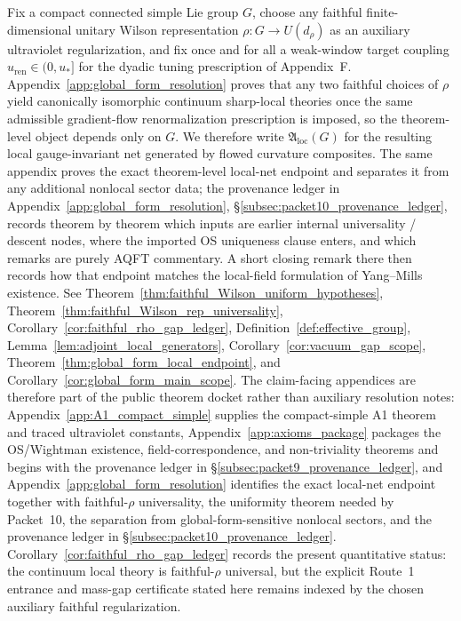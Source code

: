 \begin{theorem}\label{thm:main}
Fix a compact connected simple Lie group $G$, choose any faithful finite-dimensional unitary Wilson representation $\rho:G\to U(d_\rho)$ as an auxiliary ultraviolet regularization, and fix once and for all a weak-window target coupling $u_{\mathrm{ren}}\in(0,u_\ast]$ for the dyadic tuning prescription of Appendix~F.
Appendix~\ref{app:global_form_resolution} proves that any two faithful choices of $\rho$ yield canonically isomorphic continuum sharp-local theories once the same admissible gradient-flow renormalization prescription is imposed, so the theorem-level object depends only on $G$.
We therefore write $\mathfrak A_{\mathrm{loc}}(G)$ for the resulting local gauge-invariant net generated by flowed curvature composites.
The same appendix proves the exact theorem-level local-net endpoint and separates it from any additional nonlocal sector data; the provenance ledger in Appendix~\ref{app:global_form_resolution}, \S\ref{subsec:packet10_provenance_ledger}, records theorem by theorem which inputs are earlier internal universality / descent nodes, where the imported OS uniqueness clause enters, and which remarks are purely AQFT commentary. A short closing remark there then records how that endpoint matches the local-field formulation of Yang--Mills existence.
See Theorem~\ref{thm:faithful_Wilson_uniform_hypotheses}, Theorem~\ref{thm:faithful_Wilson_rep_universality}, Corollary~\ref{cor:faithful_rho_gap_ledger}, Definition~\ref{def:effective_group}, Lemma~\ref{lem:adjoint_local_generators}, Corollary~\ref{cor:vacuum_gap_scope}, Theorem~\ref{thm:global_form_local_endpoint}, and Corollary~\ref{cor:global_form_main_scope}.
The claim-facing appendices are therefore part of the public theorem docket rather than auxiliary resolution notes: Appendix~\ref{app:A1_compact_simple} supplies the compact-simple A1 theorem and traced ultraviolet constants, Appendix~\ref{app:axioms_package} packages the OS/Wightman existence, field-correspondence, and non-triviality theorems and begins with the provenance ledger in \S\ref{subsec:packet9_provenance_ledger}, and Appendix~\ref{app:global_form_resolution} identifies the exact local-net endpoint together with faithful-$\rho$ universality, the uniformity theorem needed by Packet~10, the separation from global-form-sensitive nonlocal sectors, and the provenance ledger in \S\ref{subsec:packet10_provenance_ledger}.
Corollary~\ref{cor:faithful_rho_gap_ledger} records the present quantitative status: the continuum local theory is faithful-$\rho$ universal, but the explicit Route~1 entrance and mass-gap certificate stated here remains indexed by the chosen auxiliary faithful regularization.

\end{theorem}

